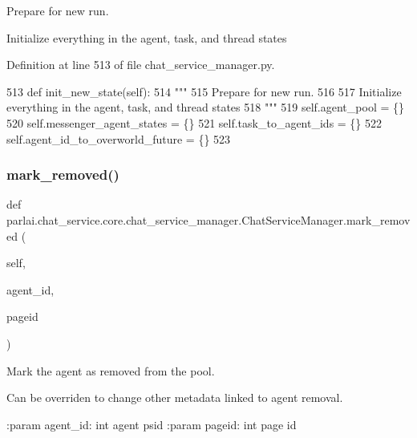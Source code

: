 \begin{DoxyVerb}Prepare for new run.

Initialize everything in the agent, task, and thread states
\end{DoxyVerb}
 

Definition at line 513 of file chat\+\_\+service\+\_\+manager.\+py.


\begin{DoxyCode}
513     \textcolor{keyword}{def }init\_new\_state(self):
514         \textcolor{stringliteral}{"""}
515 \textcolor{stringliteral}{        Prepare for new run.}
516 \textcolor{stringliteral}{}
517 \textcolor{stringliteral}{        Initialize everything in the agent, task, and thread states}
518 \textcolor{stringliteral}{        """}
519         self.agent\_pool = \{\}
520         self.messenger\_agent\_states = \{\}
521         self.task\_to\_agent\_ids = \{\}
522         self.agent\_id\_to\_overworld\_future = \{\}
523 
\end{DoxyCode}
\mbox{\label{classparlai_1_1chat__service_1_1core_1_1chat__service__manager_1_1ChatServiceManager_acd647091b75f07e2d3744b0d895c9d8c}} 
\subsubsection{\texorpdfstring{mark\+\_\+removed()}{mark\_removed()}}
{\footnotesize\ttfamily def parlai.\+chat\+\_\+service.\+core.\+chat\+\_\+service\+\_\+manager.\+Chat\+Service\+Manager.\+mark\+\_\+removed (\begin{DoxyParamCaption}\item[{}]{self,  }\item[{}]{agent\+\_\+id,  }\item[{}]{pageid }\end{DoxyParamCaption})}

\begin{DoxyVerb}Mark the agent as removed from the pool.

Can be overriden to change other metadata linked to agent removal.

:param agent_id:
    int agent psid
:param pageid:
    int page id
\end{DoxyVerb}
 

